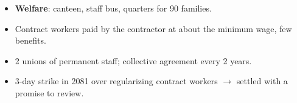 {\begin{itemize}
    Security Act 2074; medical insurance.
  \item \textbf{Welfare}: canteen, staff bus, quarters for 90 families.
  \item Contract workers paid by the contractor at about the minimum wage, few benefits.
\end{itemize}
\begin{itemize}
  \item 2 unions of permanent staff; collective agreement every 2 years.
  \item 3-day strike in 2081 over regularizing contract workers $\rightarrow$ settled with a
    promise to review.
\end{itemize}}



